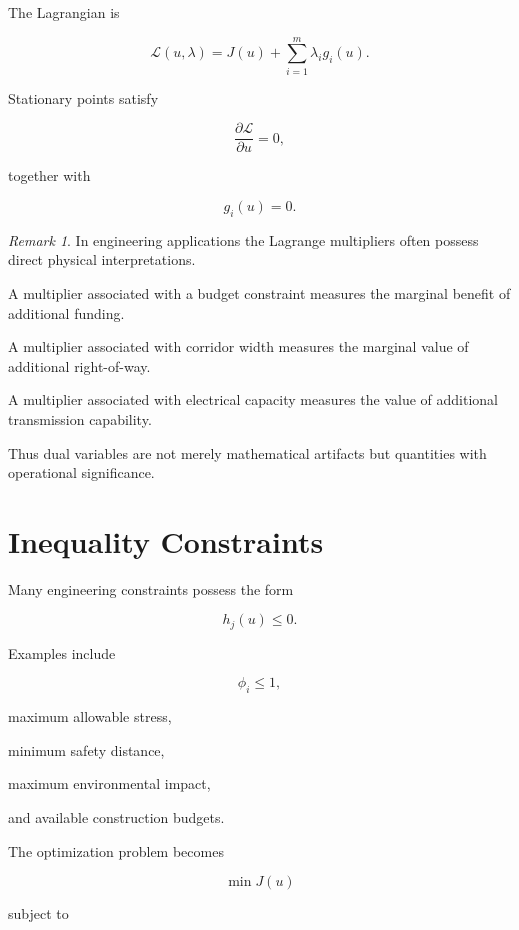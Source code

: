 \documentclass[11pt,fleqn]{book}
\numberwithin{equation}{chapter}
\theoremstyle{plain}
\theoremstyle{definition}
\theoremstyle{remark}
\newtheorem{remark}[theorem]{Remark}
\begin{document}
The Lagrangian is

\[
\boxed{
\mathcal L(u,\lambda)
=
J(u)
+
\sum_{i=1}^m
\lambda_i
g_i(u).
}
\]

Stationary points satisfy

\[
\frac{\partial\mathcal L}{\partial u}=0,
\]

together with

\[
g_i(u)=0.
\]


\begin{remark}

In engineering applications the Lagrange multipliers often possess
direct physical interpretations.

A multiplier associated with a budget constraint measures the marginal
benefit of additional funding.

A multiplier associated with corridor width measures the marginal value
of additional right-of-way.

A multiplier associated with electrical capacity measures the value of
additional transmission capability.

Thus dual variables are not merely mathematical artifacts but quantities
with operational significance.

\end{remark}


\section{Inequality Constraints}

Many engineering constraints possess the form

\[
h_j(u)\le0.
\]

Examples include

\[
\phi_i\le1,
\]

maximum allowable stress,

minimum safety distance,

maximum environmental impact,

and available construction budgets.


The optimization problem becomes

\[
\min
J(u)
\]

subject to
\end{document}

